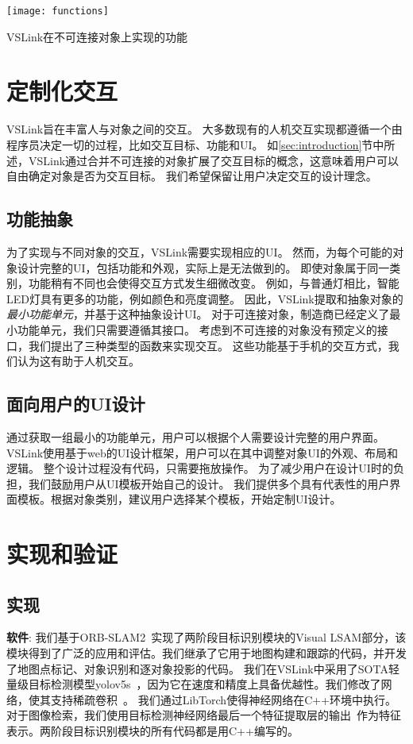 \begin{table}[t]
	\centering
	\texttt{[image: functions]}
	\caption{VSLink在不可连接对象上实现的功能}
	\label{table:functions}
\end{table}

\section{定制化交互}\label{sec:flexible}
VSLink旨在丰富人与对象之间的交互。
大多数现有的人机交互实现都遵循一个由程序员决定一切的过程，比如交互目标、功能和UI。
如\ref{sec:introduction}节中所述，VSLink通过合并不可连接的对象扩展了交互目标的概念，这意味着用户可以自由确定对象是否为交互目标。
我们希望保留让用户决定交互的设计理念。
\subsection{功能抽象}
为了实现与不同对象的交互，VSLink需要实现相应的UI。
然而，为每个可能的对象设计完整的UI，包括功能和外观，实际上是无法做到的。
即使对象属于同一类别，功能稍有不同也会使得交互方式发生细微改变。
例如，与普通灯相比，智能LED灯具有更多的功能，例如颜色和亮度调整。
因此，VSLink提取和抽象对象的\textit{最小功能单元}，并基于这种抽象设计UI。
对于可连接对象，制造商已经定义了最小功能单元，我们只需要遵循其接口。
考虑到不可连接的对象没有预定义的接口，我们提出了三种类型的函数来实现交互。
这些功能基于手机的交互方式，我们认为这有助于人机交互。

% 
 
\subsection{面向用户的UI设计}
通过获取一组最小的功能单元，用户可以根据个人需要设计完整的用户界面。
VSLink使用基于web的UI设计框架，用户可以在其中调整对象UI的外观、布局和逻辑。
整个设计过程没有代码，只需要拖放操作。
为了减少用户在设计UI时的负担，我们鼓励用户从UI模板开始自己的设计。
我们提供多个具有代表性的用户界面模板。根据对象类别，建议用户选择某个模板，开始定制UI设计。

\section{实现和验证}\label{sec:eval}
\subsection{实现}
\textbf{软件}: 我们基于ORB-SLAM2~\cite{mur2017orb}实现了两阶段目标识别模块的Visual LSAM部分，该模块得到了广泛的应用和评估。我们继承了它用于地图构建和跟踪的代码，并开发了地图点标记、对象识别和逐对象投影的代码。
我们在VSLink中采用了SOTA轻量级目标检测模型yolov5s~\cite{glenn_jocher_2020_4154370}，因为它在速度和精度上具备优越性。我们修改了网络，使其支持稀疏卷积~\cite{ren2018sbnet}。
我们通过LibTorch使得神经网络在C++环境中执行。
对于图像检索，我们使用目标检测神经网络最后一个特征提取层的输出~\cite{glenn_jocher_2020_4154370}作为特征表示。两阶段目标识别模块的所有代码都是用C++编写的。

